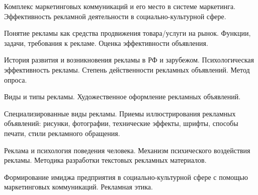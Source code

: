 \documentclass[
	14pt,
	a4paper,
	]
	{scrartcl}
\begin{document}
\shapk
{}
\setcounter{zad}{0}

\vfill
\z Комплекс маркетинговых коммуникаций и его место в системе маркетинга.
 \vfill
\z Эффективность рекламной деятельности в социально-культурной сфере. \vfill

\vfill

\newpage


\shapk
{}
\setcounter{zad}{0}

\vfill
\z Понятие рекламы как средства продвижения товара/услуги на рынок. Функции, задачи, требования к рекламе.
 \vfill
\z Оценка эффективности объявления.
 \vfill

\vfill

\newpage


\shapk
{}
\setcounter{zad}{0}

\vfill
\z История развития и возникновения рекламы в РФ и зарубежом.
 \vfill
\z Психологическая эффективность рекламы. Степень действенности рекламных объявлений. Метод опроса.
 \vfill

\vfill

\newpage


\shapk
{}
\setcounter{zad}{0}

\vfill
\z Виды и типы рекламы.
 \vfill
\z Художественное оформление рекламных объявлений.
 \vfill

\vfill

\newpage


\shapk
{}
\setcounter{zad}{0}

\vfill
\z Специализированные виды рекламы.
 \vfill
\z Приемы иллюстрирования рекламных объявлений: рисунки, фотографии, технические эффекты, шрифты, способы печати, стили рекламного обращения.
 \vfill

\vfill

\newpage


\shapk
{}
\setcounter{zad}{0}

\vfill
\z Реклама и психология поведения человека. Механизм психического воздействия рекламы.
 \vfill
\z Методика разработки текстовых рекламных материалов.
 \vfill

\vfill

\newpage


\shapk
{}
\setcounter{zad}{0}

\vfill
\z Формирование имиджа предприятия в социально-культурной сфере с помощью маркетинговых коммуникаций.
 \vfill
\z Рекламная этика.
 \vfill
\end{document}
